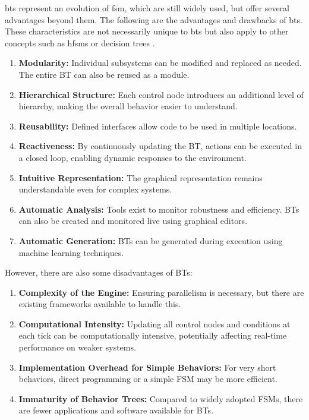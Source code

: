 \Glspl{bt} represent an evolution of \gls{fsm}, which are still widely used, but offer several advantages beyond them. The following are the advantages and drawbacks of \glspl{bt}. These characteristics are not necessarily unique to \glspl{bt} but also apply to other concepts such as \glspl{hfsm} or decision trees \cite{colledanchise_behavior_2018}.

\begin{enumerate}
  \item \textbf{Modularity:} Individual subsystems can be modified and replaced as needed. The entire BT can also be reused as a module.
  \item \textbf{Hierarchical Structure:} Each control node introduces an additional level of hierarchy, making the overall behavior easier to understand.
  \item \textbf{Reusability:} Defined interfaces allow code to be used in multiple locations.
  \item \textbf{Reactiveness:} By continuously updating the BT, actions can be executed in a closed loop, enabling dynamic responses to the environment.
  \item \textbf{Intuitive Representation:} The graphical representation remains understandable even for complex systems.
  \item \textbf{Automatic Analysis:} Tools exist to monitor robustness and efficiency. BTs can also be created and monitored live using graphical editors.
  \item \textbf{Automatic Generation:} BTs can be generated during execution using machine learning techniques.
\end{enumerate}

However, there are also some disadvantages of BTs:

\begin{enumerate}
  \item \textbf{Complexity of the Engine:} Ensuring parallelism is necessary, but there are existing frameworks available to handle this.
  \item \textbf{Computational Intensity:} Updating all control nodes and conditions at each tick can be computationally intensive, potentially affecting real-time performance on weaker systems.
  \item \textbf{Implementation Overhead for Simple Behaviors:} For very short behaviors, direct programming or a simple FSM may be more efficient.
  \item \textbf{Immaturity of Behavior Trees:} Compared to widely adopted FSMs, there are fewer applications and software available for BTs.
\end{enumerate}


